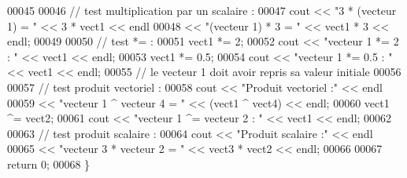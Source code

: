 \begin{DoxyCode}
00045          
00046     \textcolor{comment}{// test multiplication par un scalaire :}
00047     cout << \textcolor{stringliteral}{"3 * (vecteur 1) = "} << 3 * vect1 << endl
00048          << \textcolor{stringliteral}{"(vecteur 1) * 3 = "} << vect1 * 3 << endl;
00049     
00050     \textcolor{comment}{// test *= :}
00051     vect1 *= 2;
00052     cout << \textcolor{stringliteral}{"vecteur 1 *= 2 : "} << vect1 << endl;
00053     vect1 *= 0.5;
00054     cout << \textcolor{stringliteral}{"vecteur 1 *= 0.5 : "} << vect1 << endl;
00055        \textcolor{comment}{// le vecteur 1 doit avoir repris sa valeur initiale}
00056     
00057     \textcolor{comment}{// test produit vectoriel :}
00058     cout << \textcolor{stringliteral}{"Produit vectoriel :"} << endl
00059          << \textcolor{stringliteral}{"vecteur 1 ^ vecteur 4 = "} << (vect1 ^ vect4) << endl;
00060     vect1 ^= vect2;
00061     cout << \textcolor{stringliteral}{"vecteur 1 ^= vecteur 2 : "} << vect1 << endl;
00062          
00063     \textcolor{comment}{// test produit scalaire :}
00064     cout << \textcolor{stringliteral}{"Produit scalaire :"} << endl
00065          << \textcolor{stringliteral}{"vecteur 3 * vecteur 2 = "} << vect3 * vect2 << endl;
00066     
00067     \textcolor{keywordflow}{return} 0;
00068 \}
\end{DoxyCode}
